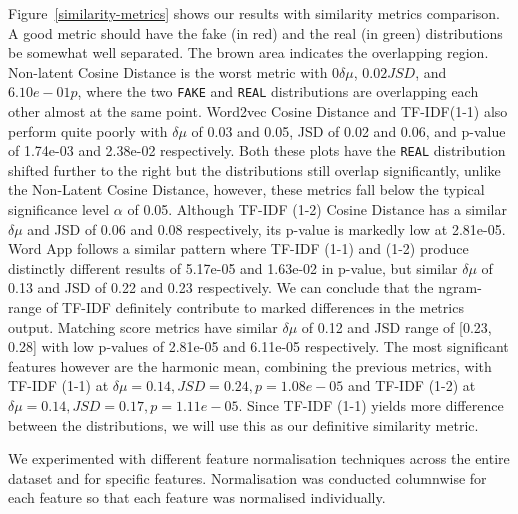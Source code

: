 \documentclass{article}
\begin{document}
Figure~\ref{similarity-metrics} shows our results with similarity metrics comparison. A good metric should have the fake (in red) and the real (in green) distributions be somewhat well separated. The brown area indicates the overlapping region. Non-latent Cosine Distance is the worst metric with $0 \delta \mu$, $0.02 JSD$, and $6.10e-01 p$, where the two \texttt{FAKE} and \texttt{REAL} distributions are overlapping each other almost at the same point. Word2vec Cosine Distance and TF-IDF(1-1) also perform quite poorly with $\delta \mu$ of 0.03 and 0.05, JSD of 0.02 and 0.06, and p-value of 1.74e-03 and 2.38e-02 respectively. Both these plots have the \texttt{REAL} distribution shifted further to the right but the distributions still overlap significantly, unlike the Non-Latent Cosine Distance, however, these metrics fall below the typical significance level $\alpha$ of 0.05. Although TF-IDF (1-2) Cosine Distance has a similar $\delta \mu$ and JSD of 0.06 and 0.08 respectively, its p-value is markedly low at 2.81e-05. Word App follows a similar pattern where TF-IDF (1-1) and (1-2) produce distinctly different results of 5.17e-05 and 1.63e-02 in p-value, but similar $\delta \mu$ of 0.13 and JSD of 0.22 and 0.23 respectively. We can conclude that the ngram-range of TF-IDF definitely contribute to marked differences in the metrics output. Matching score metrics have similar $\delta \mu$ of 0.12 and JSD range of [0.23, 0.28] with low p-values of 2.81e-05 and 6.11e-05 respectively. The most significant features however are the harmonic mean, combining the previous metrics, with TF-IDF (1-1) at $\delta \mu = 0.14, JSD = 0.24, p = 1.08e-05$ and TF-IDF (1-2) at $\delta \mu = 0.14, JSD = 0.17, p = 1.11e-05$. Since TF-IDF (1-1) yields more difference between the distributions, we will use this as our definitive similarity metric.


We experimented with different feature normalisation techniques across the entire dataset and for specific features. Normalisation was conducted columnwise for each feature so that each feature was normalised individually.
\end{document}
